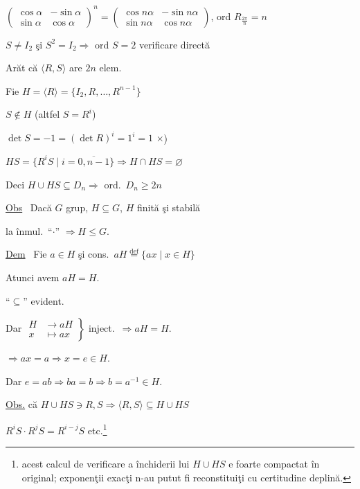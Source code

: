 \noindent{} \quad $\begin{pmatrix}\cos\alpha & -\sin\alpha\\ \sin\alpha & \cos\alpha\end{pmatrix}^{\!n} = \begin{pmatrix}\cos n\alpha & -\sin n\alpha\\ \sin n\alpha & \cos n\alpha\end{pmatrix}$, \quad ord $R_{\frac{2\pi}{n}} = n$

\bigskip
\noindent $S\neq I_2$ şi $S^2=I_2 \Rightarrow$ ord $S=2$ \hfill verificare directă

\bigskip
\bigskip
\noindent Arăt că $\langle R,S\rangle$ are $2n$ elem.

\noindent Fie $H=\langle R\rangle = \{I_2,R,\ldots,R^{n-1}\}$

\noindent $S\notin H$ (altfel $S=R^i$)

\noindent $\det S = -1 = (\det R)^i = 1^i = 1$ \quad $\times$)

\bigskip
\noindent $HS = \{R^iS \mid i=\overline{0,n-1}\} \Rightarrow H\cap HS=\varnothing$

\noindent Deci $H\cup HS \subseteq D_n \Rightarrow$ ord.\ $D_n\geq 2n$

\bigskip
\noindent\underline{Obs} \ Dacă $G$ grup, $H\subseteq G$, $H$ finită şi stabilă

\noindent la înmul.\ ``$\cdot$'' $\Rightarrow H\leq G$.

\bigskip
\noindent\underline{Dem} \ Fie $a\in H$ şi cons.\ $aH \overset{\text{def}}{=} \{ax \mid x\in H\}$

\noindent Atunci avem $aH=H$.

\noindent ``$\subseteq$'' evident.

\bigskip
\noindent Dar $\left.\begin{aligned} H&\to aH\\ x&\mapsto ax \end{aligned}\right\}$ inject.\ $\Rightarrow aH=H$.

\bigskip
\noindent $\Rightarrow ax=a \Rightarrow x=e\in H.$

\noindent Dar $e=ab \Rightarrow ba=b \Rightarrow b=a^{-1}\in H.$

\bigskip
\noindent\underline{Obs.} că $H\cup HS \ni R,S \Rightarrow \langle R,S\rangle \subseteq H\cup HS$

\noindent $R^iS\cdot R^jS = R^{i-j}S$ etc.\footnote{acest calcul de verificare a închiderii lui $H\cup HS$ e foarte compactat în original; exponenţii exacţi n-au putut fi reconstituiţi cu certitudine deplină.}

